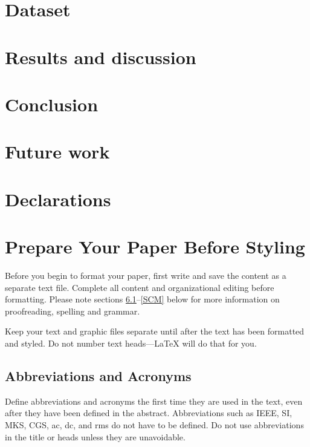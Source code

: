 \documentclass[conference]{IEEEtran}
\begin{document}
\section{Dataset}
\section{Results and discussion}
\section{Conclusion}
\section{Future work}
\section{Declarations}


\section{Prepare Your Paper Before Styling}
Before you begin to format your paper, first write and save the content as a 
separate text file. Complete all content and organizational editing before 
formatting. Please note sections \ref{AA}--\ref{SCM} below for more information on 
proofreading, spelling and grammar.

Keep your text and graphic files separate until after the text has been 
formatted and styled. Do not number text heads---{\LaTeX} will do that 
for you.

\subsection{Abbreviations and Acronyms}\label{AA}
Define abbreviations and acronyms the first time they are used in the text, 
even after they have been defined in the abstract. Abbreviations such as 
IEEE, SI, MKS, CGS, ac, dc, and rms do not have to be defined. Do not use 
abbreviations in the title or heads unless they are unavoidable.
\end{document}
